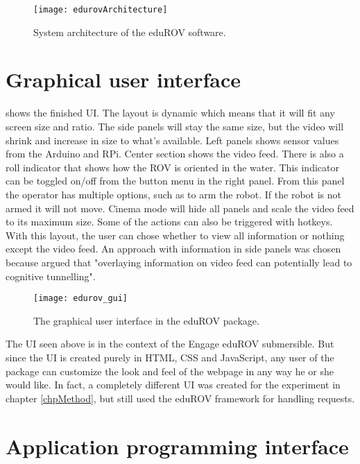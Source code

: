 \begin{figure}[h!]
    \centering
    \texttt{[image: edurovArchitecture]}
    \caption{System architecture of the eduROV software.}
    \label{edurovArchitecture}
\end{figure}

\section{Graphical user interface}

 shows the finished UI. The layout is dynamic which means that it will fit any screen size and ratio. The side panels will stay the same size, but the video will shrink and increase in size to what's available. Left panels shows sensor values from the Arduino and RPi. Center section shows the video feed. There is also a roll indicator that shows how the ROV is oriented in the water. This indicator can be toggled on/off from the button menu in the right panel. From this panel the operator has multiple options, such as to arm the robot. If the robot is not armed it will not move. Cinema mode will hide all panels and scale the video feed to its maximum size. Some of the actions can also be triggered with hotkeys. With this layout, the user can chose whether to view all information or nothing except the video feed. An approach with information in side panels was chosen because \citet{Chen2007} argued that "overlaying information on video feed can potentially lead to cognitive tunnelling".

\begin{figure}[h!]
    \centering
    \texttt{[image: edurov\_gui]}
    \caption{The graphical user interface in the eduROV package.}
    \label{edurov_gui}
\end{figure}

The UI seen above is in the context of the Engage eduROV submersible. But since the UI is created purely in HTML, CSS and JavaScript, any user of the package can customize the look and feel of the webpage in any way he or she would like. In fact, a completely different UI was created for the experiment in chapter \ref{chpMethod}, but still used the eduROV framework for handling requests.

\section{Application programming interface}

